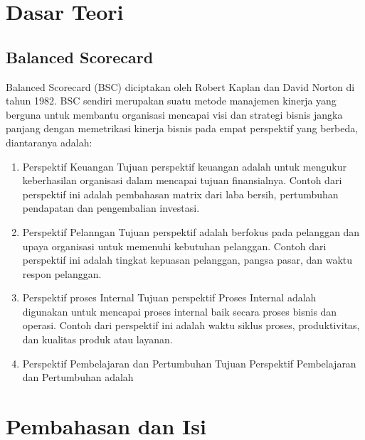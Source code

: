 \documentclass[conference]{IEEEtran}
\begin{document}
\section{Dasar Teori}

\subsection{Balanced Scorecard}
Balanced Scorecard (BSC) diciptakan oleh Robert Kaplan dan David Norton di tahun 1982. BSC sendiri merupakan suatu metode manajemen kinerja yang berguna untuk membantu organisasi mencapai visi dan strategi bisnis jangka panjang dengan memetrikasi kinerja bisnis pada empat perspektif yang berbeda, diantaranya adalah:
\begin{enumerate}
\item Perspektif Keuangan 
Tujuan perspektif keuangan adalah untuk mengukur keberhasilan organisasi dalam mencapai tujuan finansialnya. Contoh dari perspektif ini adalah pembahasan matrix dari laba bersih, pertumbuhan pendapatan dan pengembalian investasi.
\item Perspektif Pelanngan 
Tujuan perspektif adalah berfokus pada pelanggan dan upaya organisasi untuk memenuhi kebutuhan pelanggan. Contoh dari perspektif ini adalah tingkat kepuasan pelanggan, pangsa pasar, dan waktu respon pelanggan.
\item Perspektif proses Internal
Tujuan perspektif Proses Internal adalah digunakan untuk mencapai proses internal baik secara proses bisnis dan operasi. Contoh dari perspektif ini adalah waktu siklus proses, produktivitas, dan kualitas produk atau layanan.
\item Perspektif Pembelajaran dan Pertumbuhan
Tujuan Perspektif Pembelajaran dan Pertumbuhan adalah 
\end{enumerate}
\section{Pembahasan dan Isi}
\end{document}
